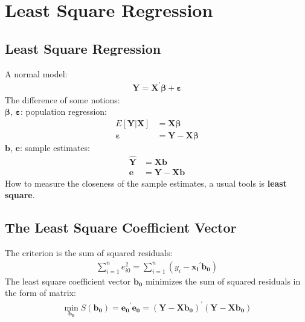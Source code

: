 \documentclass{article}
\begin{document}
\newpage
\section{Least Square Regression}
\subsection{Least Square Regression}
A normal model:
	\begin{align*}
		\boldsymbol{Y} = \boldsymbol{X}^\prime \boldsymbol{\beta} + \boldsymbol{\varepsilon}
	\end{align*}
The difference of some notions:\\
\indent $\boldsymbol{\beta}$, $\boldsymbol{\varepsilon}$: population regression:
	\begin{align*}
		E[\boldsymbol{Y} | \boldsymbol{X}] &= \boldsymbol{X} \boldsymbol{\beta}\\
		\boldsymbol{\varepsilon} &= \boldsymbol{Y} - \boldsymbol{X} \boldsymbol{\beta}
	\end{align*}
\indent $\boldsymbol{b}$, $\boldsymbol{e}$: sample estimates:
	\begin{align*}
		\hat{\boldsymbol{Y}} &= \boldsymbol{X} \boldsymbol{b}\\
		\boldsymbol{e} &= \boldsymbol{Y} - \boldsymbol{X} \boldsymbol{b}
	\end{align*}
How to measure the closeness of the sample estimates, a usual tools is \textbf{least square}.


\subsection{The Least Square Coefficient Vector}
The criterion is the sum of squared residuals:
	\begin{align*}
		\sum\limits^n_{i=1} e^2_{i0} = \sum\limits^n_{i=1} (y_i - \boldsymbol{x_i}^\prime \boldsymbol{b_0})
	\end{align*}
The least square coefficient vector $\boldsymbol{b_0}$ minimizes the sum of squared residuals in the form of matrix:
	\begin{align*}
		\min_{\boldsymbol{b_0}} S(\boldsymbol{b_0}) = \boldsymbol{e_0}^\prime \boldsymbol{e_0} = (\boldsymbol{Y} - \boldsymbol{X} \boldsymbol{b_0})^\prime (\boldsymbol{Y} - \boldsymbol{X} \boldsymbol{b_0})
	\end{align*}
\end{document}
